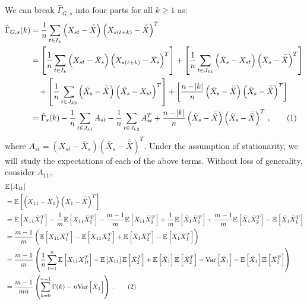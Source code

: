 \documentclass[11pt]{article}
\newcommand{\E}{\mathbb{E}}
\newcommand\numberthis{\addtocounter{equation}{1}\tag{\theequation}}
\theoremstyle{remark}
\begin{document}
 
We can break $\hat{\Gamma}_{G,s}$ into four parts for all $k \geq 1$ as:
%
\begin{align*}
\hat{\Gamma}_{G,s}(k) & = \dfrac{1}{n}\sum_{t \in I_k} \left(X_{st} - \bar{\bar{X}} \right) \left(X_{s(t+k)} - \bar{\bar{X}} \right)^T \\
    &= \left[\dfrac{1}{n} \sum_{t \in I_k} \left(X_{st} - \bar{X}_s \right) \left(X_{s(t+k)} - \bar{X}_s \right)^T \right] + \left[\dfrac{1}{n} \sum_{t \in J_{k1}}  \left( \bar{X}_s - X_{st} \right)  \left(\bar{X}_s - \bar{\bar{X}} \right)^T\right]\\ 
    & \quad + \left[\dfrac{1}{n} \sum_{t \in J_{k2}} \left(\bar{X}_s - \bar{\bar{X}} \right)  \left(\bar{X}_s - X_{st} \right)^T\right]   + \left[\dfrac{n-\abs{k}}{n} \left(\bar{X}_s - \bar{\bar{X}}\right)   \left(\bar{X}_s - \bar{\bar{X}} \right)^T\right]\\
    &= \hat{\Gamma}_s(k) - \dfrac{1}{n}\sum_{t \in J_{k1}}A_{st} - \dfrac{1}{n} \sum_{t \in J_{k2}}A_{st}^T  + \dfrac{n-\abs{k}}{n}  \left(\bar{X}_s - \bar{\bar{X}} \right)  \left(\bar{X}_s - \bar{\bar{X}} \right)^T\,, \numberthis \label{eq:acf_breakdown}
\end{align*}
%
where $A_{st} = (X_{st}-\bar{X}_s)(\bar{X}_s - \bar{\bar{X}})^T$. Under the assumption of stationarity, we will study the expectations of each of the above terms. Without loss of generality, consider $A_{11}$,
\begin{align*}
    &\E \left[A_{11} \right]\\
     &= \mathbb{E} \left[ \left(X_{11} - \bar{X}_1 \right) \left(\bar{X}_1 - \bar{\bar{X}} \right)^T \right]\\
    &= \mathbb{E} \left[X_{11}\bar{X}_1^T \right] - \dfrac{1}{m}\mathbb{E} \left[X_{11}\bar{X}_1^T \right] - \dfrac{m-1}{m}\mathbb{E} \left[X_{11}\bar{X}_2^T \right] + \dfrac{1}{m}\mathbb{E} \left[\bar{X}_1\bar{X}_1^T \right] + \dfrac{m-1}{m}\mathbb{E} \left[\bar{X}_1\bar{X}_2^T \right] - \mathbb{E} \left[\bar{X}_1\bar{X}_1^T \right]\\
    &= \dfrac{m-1}{m}\left(\mathbb{E} \left[X_{11}\bar{X}_1^T \right] - \mathbb{E} \left[X_{11}\bar{X}_2^T \right] + \mathbb{E} \left[\bar{X}_1\bar{X}_2^T \right] - \mathbb{E} \left[\bar{X}_1\bar{X}_1^T \right]\right)\\
    &= \dfrac{m-1}{m}\left(\dfrac{1}{n}\sum_{t=1}^{n}\mathbb{E} \left[X_{11}X_{1t}^T \right] - \mathbb{E}\left[X_{11}\right] \mathbb{E}\left[\bar{X}_2^T \right] + \mathbb{E} \left[\bar{X}_1\right]\mathbb{E}\left[\bar{X}_2^T\right] - \text{Var}\left[\bar{X}_1 \right] - \mathbb{E}\left[\bar{X}_1 \right]\mathbb{E}\left[\bar{X}_1^T \right]\right)\\
    &= \dfrac{m-1}{mn}\left(\sum_{k=0}^{n-1}\Gamma(k) - n\text{Var}\left[\bar{X}_1 \right]\right)\,. \numberthis \label{eq:acf_2}
\end{align*}
\end{document}
